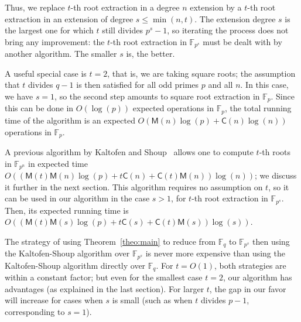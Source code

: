 \documentclass[12pt]{article}
\theoremstyle{plain}
\theoremstyle{definition}
\def\F{\mathbb{F}}
\def\M{\mathsf{M}}
\def\CC{\mathsf{C}}
\newcounter{algorithm}
\begin{document}
Thus, we replace $t$-th root extraction in a degree $n$ extension by a
$t$-th root extraction in an extension of degree $s \le \min(n,t)$.
The extension degree $s$ is the largest one for which $t$ still
divides $p^s-1$, so iterating the process does not bring any
improvement: the $t$-th root extraction in $\F_{p^s}$ must be dealt
with by another algorithm. The smaller $s$ is, the better.

A useful special case is $t=2$, that is, we are taking square roots;
the assumption that $t$ divides $q-1$ is then satisfied for all odd
primes $p$ and all $n$. In this case, we have $s=1$, so the second
step amounts to square root extraction in $\F_p$. Since this can be
done in $O(\log(p))$ expected operations in $\F_p$, the total running
time of the algorithm is an expected $O(\M(n)\log(p) + \CC(n)\log(n))$
operations in $\F_p$. 

A previous algorithm by Kaltofen and Shoup~\cite{KaltofenShoup1997}
allows one to compute $t$-th roots in $\F_{p^n}$ in expected time
$O((\M(t)\M(n)\log(p) + t \CC(n) + \CC(t)\M(n))\log(n))$; we discuss
it further in the next section. This algorithm requires no assumption
on $t$, so it can be used in our algorithm in the case $s > 1$, for
$t$-th root extraction in $\F_{p^s}$. Then, its expected running time
is $O((\M(t)\M(s)\log(p) + t \CC(s) + \CC(t)\M(s))\log(s))$.

The strategy of using Theorem~\ref{theo:main} to reduce from $\F_q$ to
$\F_{p^s}$ then using the Kaltofen-Shoup algorithm over $\F_{p^s}$
is never more expensive than using the Kaltofen-Shoup algorithm
directly over $\F_{q}$. For $t=O(1)$, both strategies are within a
constant factor; but even for the smallest case $t=2$, our algorithm
has advantages (as explained in the last section). For larger $t$, the
gap in our favor will increase for cases when $s$ is small (such 
as when $t$ divides $p-1$, corresponding to $s=1$).

\medskip
\end{document}
